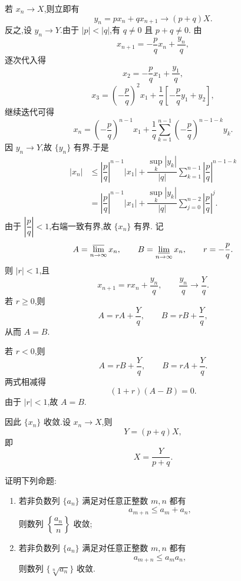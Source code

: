 \begin{solution}
  若 $x_n\to X$,则立即有
  \[
    y_n=px_n+qx_{n+1}\longrightarrow(p+q)X.
  \]
    反之,设 $y_n\to Y$.由于 $|p|<|q|$,有 $q\neq0$ 且 $p+q\neq0$.
  由
  \[
    x_{n+1}=-\dfrac{p}{q}x_n+\dfrac{y_n}{q},
  \]
  逐次代入得
  \[
    x_2=-\dfrac{p}{q}x_1+\dfrac{y_1}{q},
  \]
  \[
    x_3=
    \left(-\dfrac{p}{q}\right)^2x_1
    +\dfrac{1}{q}
    \left[
      -\dfrac{p}{q}y_1+y_2
    \right],
  \]
  继续迭代可得
  \[
    x_n=
    \left(-\dfrac{p}{q}\right)^{n-1}x_1
    +\dfrac{1}{q}
    \sum\limits_{k=1}^{n-1}
    \left(-\dfrac{p}{q}\right)^{n-1-k}y_k.
  \]
  因 $y_n\to Y$,故 $\{y_n\}$ 有界.于是
  \[
    \begin{aligned}
      |x_n|
      &\leq
      \left|\dfrac{p}{q}\right|^{n-1}|x_1|
      +\dfrac{\displaystyle\sup\limits_k|y_k|}{|q|}
      \sum\limits_{k=1}^{n-1}
      \left|\dfrac{p}{q}\right|^{n-1-k} \\
      &=
      \left|\dfrac{p}{q}\right|^{n-1}|x_1|
      +\dfrac{\displaystyle\sup\limits_k|y_k|}{|q|}
      \sum\limits_{j=0}^{n-2}
      \left|\dfrac{p}{q}\right|^j.
    \end{aligned}
  \]
   由于 $\left|\dfrac{p}{q}\right|<1$,右端一致有界,故 $\{x_n\}$ 有界.
  记
  \[
    A=\varlimsup\limits_{n\to\infty}x_n,
    \qquad
    B=\varliminf\limits_{n\to\infty}x_n,
    \qquad
    r=-\dfrac{p}{q}.
  \]
  则 $|r|<1$,且
  \[
    x_{n+1}=rx_n+\dfrac{y_n}{q},
    \qquad
    \dfrac{y_n}{q}\longrightarrow\dfrac{Y}{q}.
  \]
  若 $r\geq0$,则
  \[
    A=rA+\dfrac{Y}{q},
    \qquad
    B=rB+\dfrac{Y}{q},
  \]
  从而 $A=B$.

  若 $r<0$,则
  \[
    A=rB+\dfrac{Y}{q},
    \qquad
    B=rA+\dfrac{Y}{q}.
  \]
  两式相减得
  \[
    (1+r)(A-B)=0.
  \]
  由于 $|r|<1$,故 $A=B$.

  因此 $\{x_n\}$ 收敛.设 $x_n\to X$,则
  \[
    Y=(p+q)X,
  \]
  即
  \[
    X=\dfrac{Y}{p+q}.
  \]
\end{solution}


\begin{example}

  证明下列命题:

  \begin{enumerate}

    \item 若非负数列 $\{a_n\}$ 满足对任意正整数 $m,n$ 都有
          \[
            a_{m+n}\leq a_m+a_n,
          \]
          则数列 $\left\{\dfrac{a_n}{n}\right\}$ 收敛;

    \item 若非负数列 $\{a_n\}$ 满足对任意正整数 $m,n$ 都有
          \[
            a_{m+n}\leq a_m a_n,
          \]
          则数列 $\{\sqrt[n]{a_n}\}$ 收敛.

  \end{enumerate}

\end{example}

